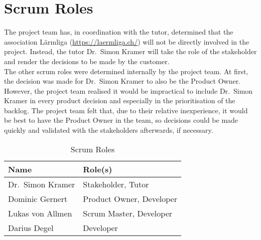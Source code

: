 \section{Scrum Roles}\label{sec:scrum_roles}
The project team has, in coordination with the tutor, determined that the association Lärmliga (\url{https://laermliga.ch/}) will not be directly involved
in the project. Instead, the tutor Dr.\ Simon Kramer will take the role of the stakeholder and render the decisions to be made by the customer. \\
The other scrum roles were determined internally by the project team. At first, the decision was made for Dr.\ Simon Kramer to also be the Product Owner.
However, the project team realised it would be impractical to include Dr.\ Simon Kramer in every product decision and especially in the prioritisation of the backlog.
The project team felt that, due to their relative inexperience, it would be best to have the Product Owner in the team, so decisions could be made quickly and validated
with the stakeholders afterwards, if necessary.
\begin{table}[H]
    \centering
    \begin{tabular}{l l}
        \toprule
        \textbf{Name}     & \textbf{Role(s)}         \\
        \midrule
        Dr.\ Simon Kramer & Stakeholder, Tutor       \\
        \midrule
        Dominic Gernert   & Product Owner, Developer \\
        \midrule
        Lukas von Allmen  & Scrum Master, Developer  \\
        \midrule
        Darius Degel      & Developer                \\
        \bottomrule
    \end{tabular}
    \caption{Scrum Roles}\label{table:scrum_roles}
\end{table}
